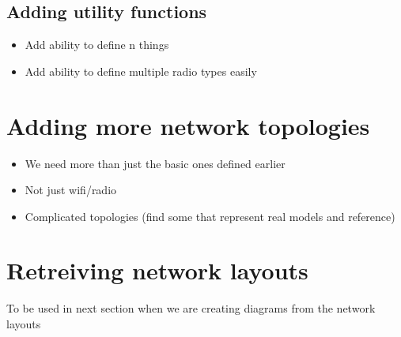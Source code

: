 \subsection{Adding utility functions}
\begin{itemize}
    \item Add ability to define {n} things
    \item Add ability to define multiple radio types easily
\end{itemize}


\section{Adding more network topologies}
\begin{itemize}
    \item We need more than just the basic ones defined earlier
    \item Not just wifi/radio
    \item Complicated topologies (find some that represent real models and reference)
\end{itemize}


\section{Retreiving network layouts}
To be used in next section when we are creating diagrams from the network layouts
